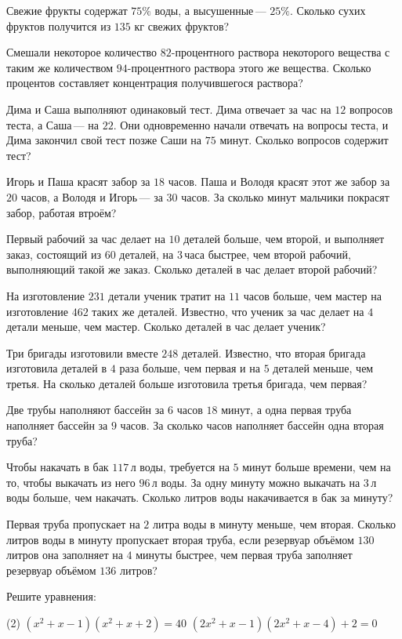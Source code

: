 \begin{class}[number=2]
	\begin{listofex}
		\item Свежие фрукты содержат \( 75\% \) воды, а высушенные --- \( 25\% \). Сколько сухих фруктов получится из \( 135 \) кг свежих фруктов?
		\item Смешали некоторое количество \( 82 \)-процентного раствора некоторого вещества с таким же количеством \( 94 \)-процентного раствора этого же вещества. Сколько процентов составляет концентрация получившегося раствора?
		\item Дима и Саша выполняют одинаковый тест. Дима отвечает за час на \( 12 \) вопросов теста, а Саша --- на \( 22 \). Они одновременно начали отвечать на вопросы теста, и Дима закончил свой тест позже Саши на \( 75 \) минут. Сколько вопросов содержит тест?
		\item Игорь и Паша красят забор за \( 18 \) часов. Паша и Володя красят этот же забор за \( 20 \) часов, а Володя и Игорь --- за \( 30 \) часов. За сколько минут мальчики покрасят забор, работая втроём?
		\item Первый рабочий за час делает на \( 10 \) деталей больше, чем второй, и выполняет заказ, состоящий из \( 60 \) деталей, на \( 3 \) часа быстрее, чем второй рабочий, выполняющий такой же заказ. Сколько деталей в час делает второй рабочий?
		\item На изготовление \( 231 \) детали ученик тратит на \( 11 \) часов больше, чем мастер на изготовление \( 462 \) таких же деталей. Известно, что ученик за час делает на \( 4 \) детали меньше, чем мастер. Сколько деталей в час делает ученик?
		\item Три бригады изготовили вместе \( 248 \) деталей. Известно, что вторая бригада изготовила деталей в \( 4 \) раза больше, чем первая и на \( 5 \) деталей меньше, чем третья. На сколько деталей больше изготовила третья бригада, чем первая?
		\item Две трубы наполняют бассейн за \( 6 \) часов \( 18 \) минут, а одна первая труба наполняет бассейн за \( 9 \) часов. За сколько часов наполняет бассейн одна вторая труба?
		\item Чтобы накачать в бак \( 117 \) л воды, требуется на \( 5 \) минут больше времени, чем на то, чтобы выкачать из него \( 96 \) л воды. За одну минуту можно выкачать на \( 3 \) л воды больше, чем накачать. Сколько литров воды накачивается в бак за минуту?
		\item Первая труба пропускает на \( 2 \) литра воды в минуту меньше, чем вторая. Сколько литров воды в минуту пропускает вторая труба, если резервуар объёмом \( 130 \) литров она заполняет на \( 4 \) минуты быстрее, чем первая труба заполняет резервуар объёмом \( 136 \) литров?
		\item Решите уравнения:
		\begin{tasks}(2)
			\task \( (x^2+x-1)(x^2+x+2)=40 \)
			\task \( (2x^2+x-1)(2x^2+x-4)+2=0 \)
		\end{tasks}
	\end{listofex}
\end{class}

